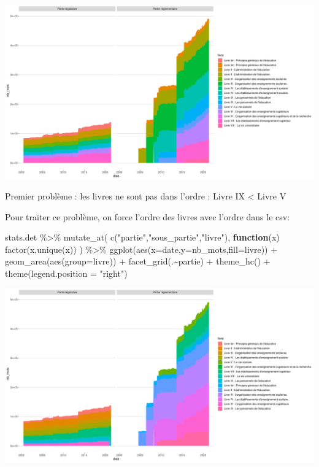 \documentclass[
  oneside]{book}
\newenvironment{Shaded}{\begin{snugshade}}{\end{snugshade}}
\newcommand{\AttributeTok}[1]{\textcolor[rgb]{0.77,0.63,0.00}{#1}}
\newcommand{\ControlFlowTok}[1]{\textcolor[rgb]{0.13,0.29,0.53}{\textbf{#1}}}
\newcommand{\FunctionTok}[1]{\textcolor[rgb]{0.00,0.00,0.00}{#1}}
\newcommand{\NormalTok}[1]{#1}
\newcommand{\SpecialCharTok}[1]{\textcolor[rgb]{0.00,0.00,0.00}{#1}}
\newcommand{\StringTok}[1]{\textcolor[rgb]{0.31,0.60,0.02}{#1}}
\begin{document}
\includegraphics{05-images_files/figure-latex/det.1-1.pdf}

Premier problème : les livres ne sont pas dans l'ordre : Livre IX \textless{} Livre V

Pour traiter ce problème, on force l'ordre des livres avec l'ordre dans le csv:

\begin{Shaded}
\begin{Highlighting}[]
\NormalTok{stats.det }\SpecialCharTok{\%\textgreater{}\%}
    \FunctionTok{mutate\_at}\NormalTok{(}
    \FunctionTok{c}\NormalTok{(}\StringTok{"partie"}\NormalTok{,}\StringTok{"sous\_partie"}\NormalTok{,}\StringTok{"livre"}\NormalTok{),}
    \ControlFlowTok{function}\NormalTok{(x) }\FunctionTok{factor}\NormalTok{(x,}\FunctionTok{unique}\NormalTok{(x))}
\NormalTok{    ) }\SpecialCharTok{\%\textgreater{}\%}
  \FunctionTok{ggplot}\NormalTok{(}\FunctionTok{aes}\NormalTok{(}\AttributeTok{x=}\NormalTok{date,}\AttributeTok{y=}\NormalTok{nb\_mots,}\AttributeTok{fill=}\NormalTok{livre)) }\SpecialCharTok{+}
  \FunctionTok{geom\_area}\NormalTok{(}\FunctionTok{aes}\NormalTok{(}\AttributeTok{group=}\NormalTok{livre)) }\SpecialCharTok{+}
  \FunctionTok{facet\_grid}\NormalTok{(.}\SpecialCharTok{\textasciitilde{}}\NormalTok{partie)  }\SpecialCharTok{+}
  \FunctionTok{theme\_hc}\NormalTok{() }\SpecialCharTok{+} 
  \FunctionTok{theme}\NormalTok{(}\AttributeTok{legend.position =} \StringTok{"right"}\NormalTok{)}
\end{Highlighting}
\end{Shaded}

\includegraphics{05-images_files/figure-latex/det.2-1.pdf}
\end{document}

